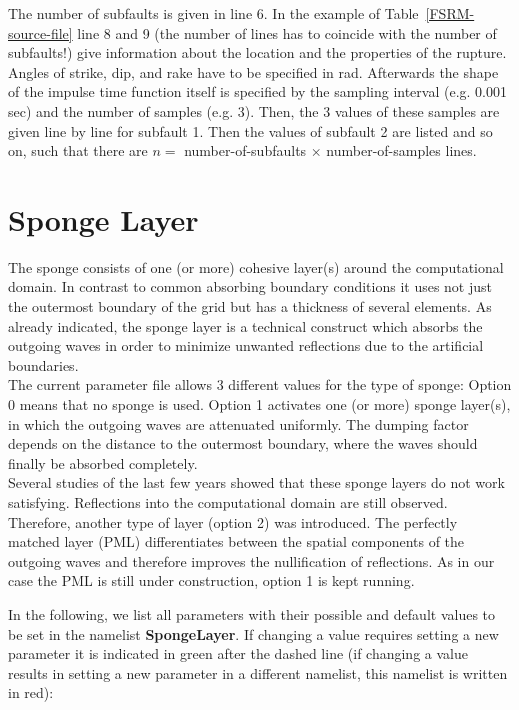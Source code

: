 \documentclass[12pt,twoside]{article}
\begin{document}
The number of subfaults is given in line 6. In the example of Table~\ref{FSRM-source-file} line 8 and 9
(the number of lines has to coincide with the number of subfaults!) give information about the location
and the properties of the rupture.
Angles of strike, dip, and rake have to be specified in rad.
Afterwards the shape of the impulse time function itself is specified by the sampling interval (e.g. 0.001 sec)
and the number of samples (e.g. 3).
Then, the 3 values of these samples are given line by line for subfault 1.
Then the values of subfault 2 are listed and so on, such that there are $n =$ number-of-subfaults $\times$ number-of-samples lines.

\newpage

\section{Sponge Layer}
\label{sec-block-spg}


The sponge consists of one (or more) cohesive layer(s) around the computational domain.
In contrast to common absorbing boundary conditions it uses not just the outermost boundary of the grid
but has a thickness of several elements.
As already indicated, the sponge layer is a technical construct which absorbs the outgoing waves
in order to minimize unwanted reflections due to the artificial boundaries.\\
The current parameter file allows 3 different values for the type of sponge:
Option 0 means that no sponge is used.
Option 1 activates one (or more) sponge layer(s), in which the outgoing waves are attenuated uniformly.
The dumping factor depends on the distance to the outermost boundary, where the waves should finally\index{} be absorbed completely.\\
Several studies of the last few years showed that these sponge layers do not work satisfying.
Reflections into the computational domain are still observed.
Therefore, another type of layer (option 2) was introduced.
The perfectly matched layer (PML) differentiates between the spatial components of the outgoing waves and therefore improves the
nullification of reflections.
As in our case the PML is still under construction, option 1 is kept running.\\
\newpage

In the following, we list all parameters with their possible and default values to be set in the namelist \textbf{SpongeLayer}.
If changing a value requires setting a new
parameter it is indicated in green after the dashed line (if changing a value results in setting a new
parameter in a different namelist, this namelist is written in red):\\
\end{document}
